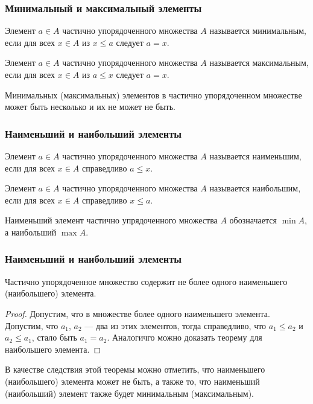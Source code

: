 \begin{frame}    
    \frametitle{Минимальный и максимальный элементы}
    
    \begin{definition}
        Элемент $a\in A$ частично упорядоченного множества $A$ называется \alert{минимальным}, если для всех $x\in A$ из $x\leq a$ следует $a=x$.
    \end{definition}
    
    \begin{definition}
        Элемент $a\in A$ частично упорядоченного множества $A$ называется \alert{максимальным}, если для всех $x\in A$ из $a\leq x$ следует $a=x$. 
    \end{definition}

    Минимальных (максимальных) элементов в частично упорядоченном множестве может быть несколько и их \alert{не может не быть}.
\end{frame}

\begin{frame}
    \frametitle{Наименьший и наибольший элементы}
    
    \begin{definition}
        Элемент $a\in A$ частично упорядоченного множества $A$ называется \alert{наименьшим}, если для всех $x\in A$ справедливо $a\leq x$. 
    \end{definition}
    
    \begin{definition}
        Элемент $a\in A$ частично упорядоченного множества $A$ называется \alert{наибольшим}, если для всех $x\in A$ справедливо $x\leq a$.
    \end{definition}
    
    Наименьший элемент частично упрядоченного множества $A$ обозначается $\min{A}$, а наибольший $\max{A}$.
\end{frame}

    
\begin{frame}
    \frametitle{Наименьший и наибольший элементы}
    
    \begin{theorem}
        Частично упорядоченное множество содержит не более одного наименьшего (наибольшего) элемента.
    \end{theorem}
    \begin{proof}    
        Допустим, что в множестве более одного наименьшего элемента. Допустим, что $a_1$, $a_2$ --- два из этих элементов, тогда справедливо, что $a_1\leq a_2$ и $a_2\leq a_1$, стало быть $a_1=a_2$. Аналогичго можно доказать теорему для наибольшего элемента.
    \end{proof}

    В качестве следствия этой теоремы можно отметить, что наименьшего (наибольшего) элемента может \alert{не быть}, а также то, что наименьший (наибольший) элемент также будет минимальным (максимальным). 
\end{frame}

